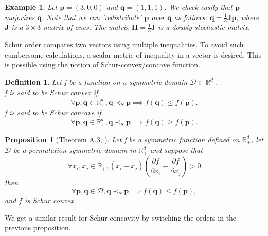 \documentclass[twoside,11pt]{book}
\newtheorem{theorem}{Theorem}
\newtheorem{proposition}{Proposition}
\newtheorem{definition}{Definition}
\newtheorem{example}{Example}
\numberwithin{theorem}{chapter}
\numberwithin{definition}{chapter}
\numberwithin{proposition}{chapter}
\numberwithin{corollary}{chapter}
\numberwithin{example}{chapter}
\numberwithin{lemma}{chapter}
\DeclareMathOperator{\Fr}{\mathrm{Fr}}
\DeclareMathOperator{\VS}{\mathrm{VS}}
\begin{document}
\begin{example}
Let $\bm{p} = (3,0,0)$ and $\bm{q} = (1,1,1)$.
We check easily that $\bm{p}$ majorizes $\bm{q}$. Note that we can 'redistribute' $\bm{p}$ over $\bm{q}$ as follows: $\bm{q} =\frac{1}{3} \bm{J} \bm{p}$, where $\bm{J}$ is a $3 \times 3$ matrix of ones. The matrix $\bm{\Pi}=\frac{1}{3}\bm{J}$ is a doubly stochastic matrix.
\end{example}
Schur order compares two vectors using multiple inequalities. To avoid such cumbersome calculations, a scalar metric of inequality in a vector is desired. This is possible using the notion of Schur-convex/concave function.

\begin{definition}
Let f be a function on a symmetric domain $\mathcal{D} \subset \mathbb{R}_{+}^{d}$.\\
f is said to be Schur convex if
\begin{equation}
    \forall \bm{p}, \bm{q} \in \mathbb{R}_{+}^{d}, \bm{q} \prec_{S} \bm{p} \implies f(\bm{q}) \leq f(\bm{p}).
\end{equation}
f is said to be Schur concave if
\begin{equation}
    \forall \bm{p}, \bm{q} \in \mathbb{R}_{+}^{d}, \bm{q} \prec_{S} \bm{p} \implies f(\bm{q}) \geq f(\bm{p}).
\end{equation}
\end{definition}


\begin{proposition}[Theorem A.3, \citealp{MaOlAr11}]\label{schur_order_partial_property}
Let f be a symmetric function defined on $\mathbb{R}_{+}^{d}$, let $\mathcal{D}$ be a permutation-symmetric domain in $\mathbb{R}_{+}^{d}$ and suppose that
\begin{equation}
\forall x_{i},x_{j} \in \mathbb{R}_{+},   (x_{i} - x_{j}) (\frac{\partial f}{\partial x_{i}} - \frac{\partial f}{\partial x_{j}}) >0 
\end{equation}
then
\begin{equation}
    \forall \bm{p}, \bm{q} \in \mathcal{D}, \bm{q} \prec_{S} \bm{p} \implies f(\bm{q}) \leq f(\bm{p}),
\end{equation}
and $f$ is Schur convex.
\end{proposition}
We get a similar result for Schur concavity by switching the orders in the previous proposition. 

\end{document}
